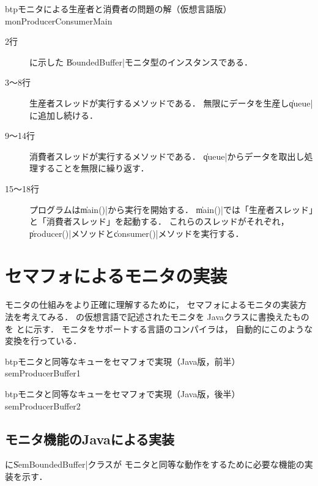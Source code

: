 \begin{myfig}{btp}{モニタによる生産者と消費者の問題の解（仮想言語版）}
{monProducerConsumerMain}

\end{myfig}

\begin{description}
\item [2行] 
に示した
\|BoundedBuffer|モニタ型のインスタンスである．

\item [3〜8行]
生産者スレッドが実行するメソッドである．
無限にデータを生産し\|queue|に追加し続ける．

\item [9〜14行]
消費者スレッドが実行するメソッドである．
\|queue|からデータを取出し処理することを無限に繰り返す．

\item [15〜18行]
プログラムは\|main()|から実行を開始する．
\|main()|では「生産者スレッド」と「消費者スレッド」を起動する．
これらのスレッドがそれぞれ，
\|producer()|メソッドと\|consumer()|メソッドを実行する．

\end{description}

\section{セマフォによるモニタの実装}
モニタの仕組みをより正確に理解するために，
セマフォによるモニタの実装方法を考えてみる．
の仮想言語で記述されたモニタを
Javaクラスに書換えたものを
とに示す．
モニタをサポートする言語のコンパイラは，
自動的にこのような変換を行っている．

\begin{myfig}{btp}{モニタと同等なキューをセマフォで実現（Java版，前半）}
{semProducerBuffer1}

\end{myfig}

\begin{myfig}{btp}{モニタと同等なキューをセマフォで実現（Java版，後半）}
{semProducerBuffer2}

\end{myfig}

\subsection{モニタ機能のJavaによる実装}
に\|SemBoundedBuffer|クラスが
モニタと同等な動作をするために必要な機能の実装を示す．

